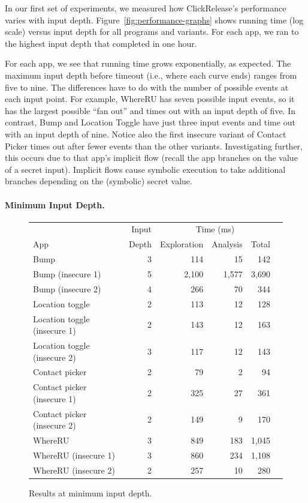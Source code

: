 \documentclass{llncs}
\newcommand{\toolname}{ClickRelease\xspace}
\begin{document}
In our first set of experiments, we measured how
\toolname{}'s performance varies with input
depth. Figure~\ref{fig:performance-graphs} shows running time (log scale)
versus input depth for all programs and variants.
For each app, we ran to the highest input depth that completed in
one hour.

For each app, we see that running time
grows exponentially, as expected. The maximum input depth
before timeout (i.e., where each curve ends) ranges from five to
nine. The differences have to do with the number of possible events at
each input point. For example, WhereRU has seven possible input events, so
it has the largest possible ``fan out'' and times out with an input
depth of five. In contrast, Bump and Location Toggle have just three
input events and time out with an input depth of nine. Notice also the first
insecure variant of Contact Picker times out after fewer events than
the other variants. Investigating further, this occurs due to
that app's implicit flow (recall the app branches on the value of a
secret input). Implicit flows cause symbolic execution to take
additional branches depending on the (symbolic) secret value.

\paragraph*{Minimum Input Depth.}

\begin{figure}[t]
  \centering
  \begin{tabular}{ | l | r | r | r | r | r | }
    \hline
    &Input&\multicolumn{3}{c|}{Time (ms)} \\ \cline{3-5}
    App & Depth & Exploration & Analysis & Total \\ \hline
    \hline
    Bump & 3 & 114 &  15 & 142 \\
    Bump (insecure 1) & 5 & 2,100 & 1,577 & 3,690 \\
    Bump (insecure 2) & 4 & 266 & 70 & 344 \\\hline
    Location toggle & 2 &  113 & 12 & 128 \\
    Location toggle (insecure 1) & 2 &  143 & 12 & 163 \\
    Location toggle (insecure 2) & 3 & 117 & 12 & 143 \\\hline
    Contact picker & 2 &  79 & 2 & 94 \\
    Contact picker (insecure 1) & 2 &  325 & 27 & 361 \\
    Contact picker (insecure 2) & 2 &  149 & 9 & 170 \\\hline
    WhereRU & 3 & 849 & 183 & 1,045 \\
    WhereRU (insecure 1) & 3 & 860 & 234 & 1,108 \\
    WhereRU (insecure 2) & 2 & 257 & 10 & 280 \\
    \hline
  \end{tabular}
  \caption{Results at minimum input depth.}
  \label{fig:results}
\end{figure}
\end{document}
